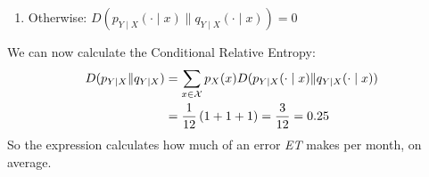 \begin{example}
\begin{enumerate}
        \item Otherwise: $D(p_{Y \mid X}(\cdot \mid x) \| q_{Y \mid X}(\cdot \mid x)) = 0$
    \end{enumerate}
    We can now calculate the Conditional Relative Entropy:
    \begin{align*}
        D(p_{Y \mid X} \| q_{Y \mid X}) &= \sum_{x \in \mathcal{X}}{p_X(x) D(p_{Y \mid X}(\cdot \mid x) \| q_{Y \mid X}(\cdot \mid x))} \\
        &= \frac{1}{12} \left(1 + 1 + 1\right) = \frac{3}{12} = 0.25
    \end{align*}
    So the expression calculates how much of an error \textit{ET} makes per month, on average.
\end{example}


